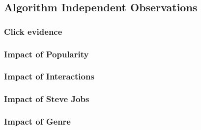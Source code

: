 \subsection{Algorithm Independent Observations}

\subsubsection{Click evidence}

\subsubsection{Impact of Popularity}

\subsubsection{Impact of Interactions}

\subsubsection{Impact of Steve Jobs}

\subsubsection{Impact of Genre}

